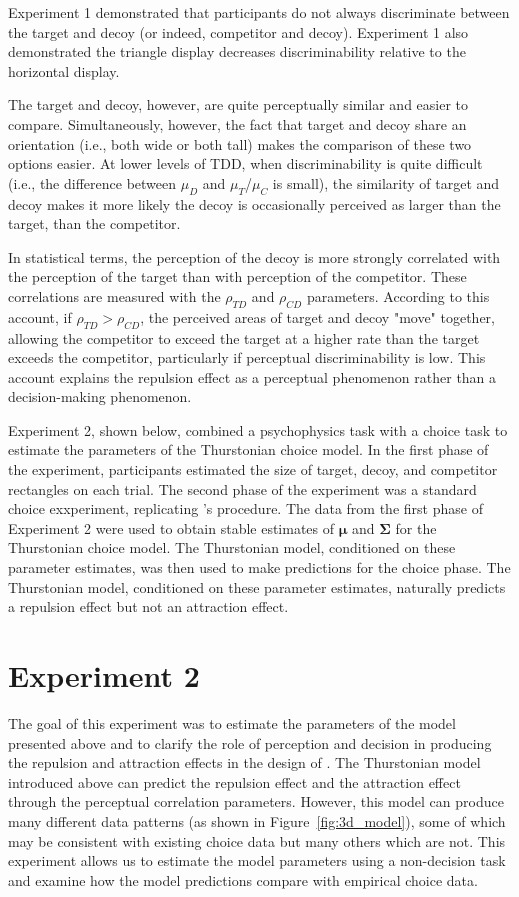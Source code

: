 Experiment 1 demonstrated that participants do not always discriminate between the target and decoy (or indeed, competitor and decoy). Experiment 1 also demonstrated the triangle display decreases discriminability relative to the horizontal display.

The target and decoy, however, are quite perceptually similar and easier to compare. Simultaneously, however, the fact that target and decoy share an orientation (i.e., both wide or both tall) makes the comparison of these two options easier. At lower levels of TDD, when discriminability is quite difficult (i.e., the difference between $\mu_{D}$ and $\mu_{T}$/$\mu_{C}$ is small), the similarity of target and decoy makes it more likely the decoy is occasionally perceived as larger than the target, than the competitor. 

In statistical terms, the perception of the decoy is more strongly correlated with the perception of the target than with perception of the competitor. These correlations are measured with the $\rho_{TD}$ and $\rho_{CD}$ parameters. According to this account, if $\rho_{TD}>\rho_{CD}$, the perceived areas of target and decoy "move" together, allowing the competitor to exceed the target at a higher rate than the target exceeds the competitor, particularly if perceptual discriminability is low. This account explains the repulsion effect as a perceptual phenomenon rather than a decision-making phenomenon.

Experiment 2, shown below, combined a psychophysics task with a choice task to estimate the parameters of the Thurstonian choice model. In the first phase of the experiment, participants estimated the size of target, decoy, and competitor rectangles on each trial. The second phase of the experiment was a standard choice exxperiment, replicating \textcite{spektorWhenGoodLooks2018b}'s procedure. The data from the first phase of Experiment 2 were used to obtain stable estimates of  $\boldsymbol{\mu}$ and $\boldsymbol{\Sigma}$ for the Thurstonian choice model. The Thurstonian model, conditioned on these parameter estimates, was then used to make predictions for the choice phase. The Thurstonian model, conditioned on these parameter estimates, naturally predicts a repulsion effect but not an attraction effect.  

\section{Experiment 2}
The goal of this experiment was to estimate the parameters of the model presented above and to clarify the role of perception and decision in producing the repulsion and attraction effects in the design of \textcite{spektorWhenGoodLooks2018b}. The Thurstonian model introduced above can predict the repulsion effect and the attraction effect through the perceptual correlation parameters. However, this model can produce many different data patterns (as shown in Figure~\ref{fig:3d_model}), some of which may be consistent with existing choice data but many others which are not. This experiment allows us to estimate the model parameters using a non-decision task and examine how the model predictions compare with empirical choice data.

